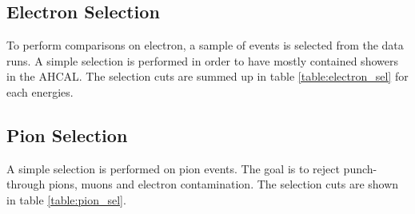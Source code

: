 \documentclass[twoside,a4paper,11pt]{article}
\begin{document}
\subsection{Electron Selection}
\label{subsec:elec_sel}
To perform comparisons on electron, a sample of events is selected from the data runs. A simple selection is performed in order to have mostly contained showers in the AHCAL. The selection cuts are summed up in table \ref{table:electron_sel} for each energies.
\begin{table}[htbp]
\centering
{}
  \caption{Selection cuts for each electron energies.}
  \label{table:electron_sel}
\end{table}
\subsection{Pion Selection}
A simple selection is performed on pion events. The goal is to reject punch-through pions, muons and electron contamination. The selection cuts are shown in table \ref{table:pion_sel}.
\begin{table}[htbp]
\centering
{}
  \caption{Selection cuts for pions.}
  \label{table:pion_sel}
\end{table}
\end{document}
